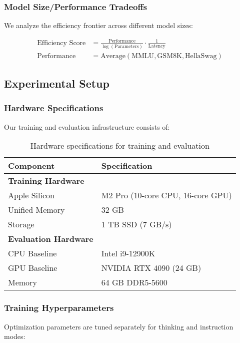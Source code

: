 \subsubsection{Model Size/Performance Tradeoffs}
We analyze the efficiency frontier across different model sizes:

\begin{align}
\text{Efficiency Score} &= \frac{\text{Performance}}{\log(\text{Parameters})} \cdot \frac{1}{\text{Latency}} \\
\text{Performance} &= \text{Average}(\text{MMLU}, \text{GSM8K}, \text{HellaSwag})
\end{align}

\subsection{Experimental Setup}

\subsubsection{Hardware Specifications}
Our training and evaluation infrastructure consists of:

\begin{table}[H]
\centering
\begin{tabular}{ll}
\toprule
Component & Specification \\
\midrule
\textbf{Training Hardware} & \\
Apple Silicon & M2 Pro (10-core CPU, 16-core GPU) \\
Unified Memory & 32 GB \\
Storage & 1 TB SSD (7 GB/s) \\
\midrule
\textbf{Evaluation Hardware} & \\
CPU Baseline & Intel i9-12900K \\
GPU Baseline & NVIDIA RTX 4090 (24 GB) \\
Memory & 64 GB DDR5-5600 \\
\bottomrule
\end{tabular}
\caption{Hardware specifications for training and evaluation}
\label{tab:hardware}
\end{table}

\subsubsection{Training Hyperparameters}
Optimization parameters are tuned separately for thinking and instruction modes:

